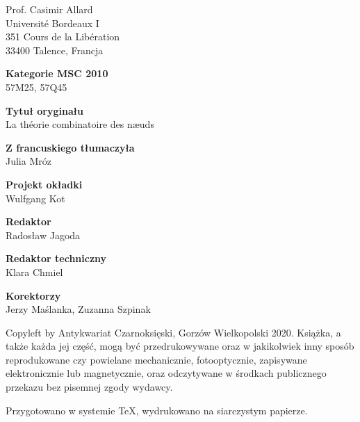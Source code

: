 \newpage

\thispagestyle{empty}
{\noindent Prof. Casimir Allard\\
Université Bordeaux I\\
351 Cours de la Libération\\
33400 Talence, Francja}
\vspace{5mm}

{\noindent \textbf{Kategorie MSC 2010}\\57M25, 57Q45} \vspace{5mm}

{\noindent \textbf{Tytuł oryginału}\\La théorie combinatoire des næuds} \vspace{5mm}

{\noindent \textbf{Z francuskiego tłumaczyła}\\Julia Mróz} \vspace{5mm}

{\noindent \textbf{Projekt okładki}\\Wulfgang Kot} \vspace{5mm}

{\noindent \textbf{Redaktor}\\Radosław Jagoda} \vspace{5mm}

{\noindent \textbf{Redaktor techniczny}\\Klara Chmiel}\vspace{5mm}

{\noindent \textbf{Korektorzy}\\Jerzy Maślanka, Zuzanna Szpinak}

\vfill

{\noindent Copyleft by Antykwariat Czarnoksięski, Gorzów Wielkopolski 2020. Książka, a także każda jej część, mogą być przedrukowywane oraz w jakikolwiek inny sposób reprodukowane czy powielane mechanicznie, fotooptycznie, zapisywane elektronicznie lub magnetycznie, oraz odczytywane w środkach publicznego przekazu bez pisemnej zgody wydawcy.}

\vspace{5mm}

{\noindent Przygotowano w systemie \TeX, wydrukowano na siarczystym papierze.}


